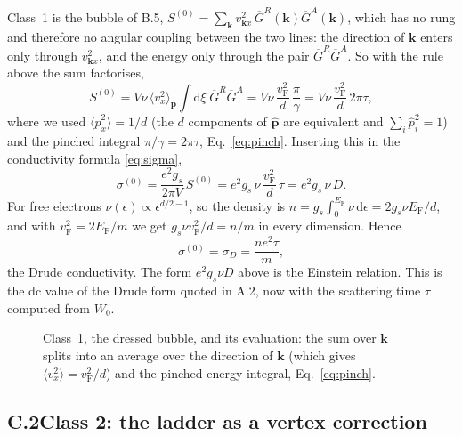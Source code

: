 Class~1 is the bubble of B.5,
$S^{(0)}=\sum_{\mathbf k}v_{\mathbf kx}^2\,
\overline G^R(\mathbf k)\overline G^A(\mathbf k)$,
which has no rung and therefore no angular coupling between the two
lines: the direction of $\mathbf k$ enters only through $v_{\mathbf kx}^2$,
and the energy only through the pair $\overline G^R\overline G^A$.
So with the rule above the sum factorises,
\[
S^{(0)}
=V\nu\,\big\langle v_x^2\big\rangle_{\hat{\mathbf p}}
\int\mathrm{d}\xi\;\overline G^R\overline G^A
=V\nu\,\frac{v_{\mathrm F}^2}{d}\,\frac{\pi}{\gamma}
=V\nu\,\frac{v_{\mathrm F}^2}{d}\,2\pi\tau,
\]
where we used $\langle\hat p_x^2\rangle=1/d$ (the $d$ components
of $\hat{\mathbf p}$ are equivalent and $\sum_i\hat p_i^2=1$) and the
pinched integral $\pi/\gamma=2\pi\tau$, Eq.~\eqref{eq:pinch}. Inserting this in
the conductivity formula \eqref{eq:sigma},
\[
\sigma^{(0)}
=\frac{e^2g_s}{2\pi V}\,S^{(0)}
=e^2g_s\,\nu\,\frac{v_{\mathrm F}^2}{d}\,\tau
=e^2g_s\,\nu\,D .
\]
For free electrons $\nu(\epsilon)\propto\epsilon^{d/2-1}$, so the
density is $n=g_s\int_0^{E_{\mathrm F}}\nu\,\mathrm{d}\epsilon
=2g_s\nu E_{\mathrm F}/d$, and with
$v_{\mathrm F}^2=2E_{\mathrm F}/m$ we get
$g_s\nu v_{\mathrm F}^2/d=n/m$ in every dimension. Hence
\[
\sigma^{(0)}=\sigma_D=\frac{ne^2\tau}{m},
\]
the Drude conductivity. The form $e^2g_s\nu D$ above is the Einstein
relation. This is the dc value of the Drude form quoted in A.2, now with the
scattering time $\tau$ computed from $W_0$.

\begin{figure}[ht]
\centering
{}
\caption{Class~1, the dressed bubble, and its evaluation: the sum over
$\mathbf k$ splits into an average over the direction of $\mathbf k$
(which gives $\langle v_x^2\rangle=v_{\mathrm F}^2/d$) and the
pinched energy integral, Eq.~\eqref{eq:pinch}.}
\label{fig:bubbleeval}
\end{figure}


\subsection*{C.2\quad Class 2: the ladder as a vertex correction}

